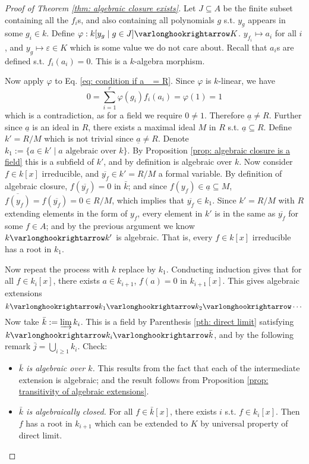 \begin{proof}[Proof of Theorem \ref{thm: algebraic closure exists}]
    Let $J \subseteq A$ be the finite subset containing all the $f_i$s, and also containing all polynomials $g$ s.t. $y_g$ appears in some $g_i \in k$. Define $\varphi: k[y_g \mid g \in J] \ext K$. $y_{f_i} \mapsto a_i$ for all $i$, and $y_g \mapsto \varepsilon \in K$ which is some value we do not care about. Recall that $a_i$s are defined s.t. $f_i(a_i) = 0$. This is a $k$-algebra morphism. 
    
    Now apply $\varphi$ to Eq. \eqref{eq: condition if a_ = R}. Since $\varphi$ is $k$-linear, we have
    \[
        0 = \sum_{i = 1}^r \varphi(g_i) f_i(a_i) = \varphi(1) = 1
    \] 
    which is a contradiction, as for a field we require $0 \neq 1$. Therefore $\underline{a} \neq R$. Further since $\underline{a}$ is an ideal in $R$, there exists a maximal ideal $M$ in $R$ s.t. $\underline{a} \subseteq R$. Define $k' = R/M$ which is not trivial since $\underline{a} \neq R$. Denote $k_1 := \{ a \in k' \mid \text{$a$ algebraic over $k$} \}$. By Proposition \ref{prop: algebraic closure is a field} this is a subfield of $k'$, and by definition is algebraic over $k$. Now consider $f \in k[x]$ irreducible, and $\overline{y_f} \in k' = R/M$ a formal variable. By definition of algebraic closure, $f(\overline{y_f}) = 0$ in $\bar{k}$; and since $f(y_f) \in \underline{a} \subseteq M$, $\overline{f(y_f)} = f(\overline{y_f}) = 0 \in R/M$, which implies that $\overline{y_f} \in k_1$. Since $k' = R/M$ with $R$ extending elements in the form of $y_f$, every element in $k'$ is in the same as $\overline{y_f}$ for some $f \in A$; and by the previous argument we know $k \ext k'$ is algebraic. That is, every $f \in k[x]$ irreducible has a root in $k_1$.

    Now repeat the process with $k$ replace by $k_1$. Conducting induction gives that for all $f \in k_i[x]$, there exists $a \in k_{i + 1}$, $f(a) = 0$ in $k_{i+1}[x]$. This gives algebraic extensions
    \[
        k \ext k_1 \ext k_2 \ext \cdots
    \]
    Now take $\bar{k} := \varinjlim k_i$. This is a field by Parenthesis \ref{pth: direct limit} satisfying $k \ext k_i \ext \bar{k}$, and by the following remark $\bar{j} = \bigcup_{i \geq 1} k_i$. Check:
    \begin{itemize}
        \item \emph{$\bar{k}$ is algebraic over $k$.} This results from the fact that each of the intermediate extension is algebraic; and the result follows from Proposition \ref{prop: transitivity of algebraic extensions}.
        \item \emph{$\bar{k}$ is algebraically closed.} For all $f \in \bar{k}[x]$, there exists $i$ s.t. $f \in k_{i}[x]$. Then $f$ has a root in $k_{i + 1}$ which can be extended to $K$ by universal property of direct limit.  
    \end{itemize}
\end{proof}

